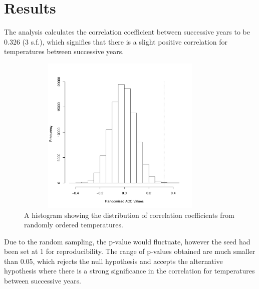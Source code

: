 \documentclass[12pt]{article}
\begin{document}
\newpage
\section{Results}
The analysis calculates the correlation coefficient between successive 
years to be 0.326 (3 s.f.), which signifies that there is a slight 
positive correlation for temperatures between successive years.

\begin{figure}[hbt!]
\centering
\includegraphics[width = 4in, height = 3in]{../data/ACC_Hist.pdf}
\caption{A histogram showing the distribution of correlation 
coefficients from randomly ordered temperatures.} 
\label{fig:Fig2}
\end{figure}

\newpage
Due to the random sampling, the p-value would fluctuate, however the 
seed had been set at 1 for reproducibility. The range of p-values 
obtained are much smaller than 0.05, which rejects the null hypothesis 
and accepts the alternative hypothesis where there is a strong 
significance in the correlation for temperatures between successive 
years. 
\end{document}
